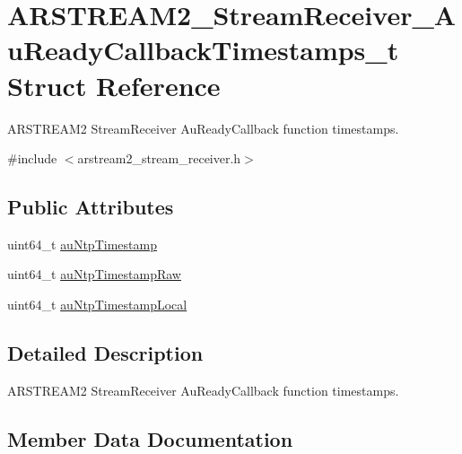 \hypertarget{struct_a_r_s_t_r_e_a_m2___stream_receiver___au_ready_callback_timestamps__t}{}\section{A\+R\+S\+T\+R\+E\+A\+M2\+\_\+\+Stream\+Receiver\+\_\+\+Au\+Ready\+Callback\+Timestamps\+\_\+t Struct Reference}
\label{struct_a_r_s_t_r_e_a_m2___stream_receiver___au_ready_callback_timestamps__t}


A\+R\+S\+T\+R\+E\+A\+M2 Stream\+Receiver Au\+Ready\+Callback function timestamps.  




{\ttfamily \#include $<$arstream2\+\_\+stream\+\_\+receiver.\+h$>$}

\subsection*{Public Attributes}
\begin{DoxyCompactItemize}
\item 
uint64\+\_\+t \hyperlink{struct_a_r_s_t_r_e_a_m2___stream_receiver___au_ready_callback_timestamps__t_a76dda4142e3f6b87d7c804d16e485815}{au\+Ntp\+Timestamp}
\item 
uint64\+\_\+t \hyperlink{struct_a_r_s_t_r_e_a_m2___stream_receiver___au_ready_callback_timestamps__t_a0f72682edcdbcc964930d2a9c0e7e85c}{au\+Ntp\+Timestamp\+Raw}
\item 
uint64\+\_\+t \hyperlink{struct_a_r_s_t_r_e_a_m2___stream_receiver___au_ready_callback_timestamps__t_a652da48ccaccde30e34d0cade10d7105}{au\+Ntp\+Timestamp\+Local}
\end{DoxyCompactItemize}


\subsection{Detailed Description}
A\+R\+S\+T\+R\+E\+A\+M2 Stream\+Receiver Au\+Ready\+Callback function timestamps. 

\subsection{Member Data Documentation}
